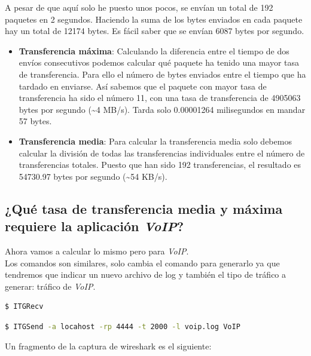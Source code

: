 \documentclass[11pt,a4paper]{article}
\begin{document}
A pesar de que aquí solo he puesto unos pocos, se envían un total de 192 paquetes en 2 segundos. Haciendo la suma de los bytes enviados en cada paquete hay un total de 12174 bytes. Es fácil saber que se envían 6087 bytes por segundo.

\begin{itemize}
	\item \textbf{Transferencia máxima}: Calculando la diferencia entre el tiempo de dos envíos consecutivos podemos calcular qué paquete ha tenido una mayor tasa de transferencia. Para ello el número de bytes enviados entre el tiempo que ha tardado en enviarse. Así sabemos que el paquete con mayor tasa de transferencia ha sido el número 11, con una tasa de transferencia de 4905063 bytes por segundo (\textasciitilde 4 MB/s). Tarda solo 0.00001264 milisegundos en mandar 57 bytes.
	\item \textbf{Transferencia media}: Para calcular la transferencia media solo debemos calcular la división de todas las transferencias individuales entre el número de transferencias totales. Puesto que han sido 192 transferencias, el resultado es 54730.97 bytes por segundo (\textasciitilde 54 KB/s).
\end{itemize}

\subsection{¿Qué tasa de transferencia media y máxima requiere la aplicación \textit{VoIP}?}

Ahora vamos a calcular lo mismo pero para \textit{VoIP}.\\

Los comandos son similares, solo cambia el comando para generarlo ya que tendremos que indicar un nuevo archivo de log y también el tipo de tráfico a generar: tráfico de \textit{VoIP}.

\begin{lstlisting}[language=bash,caption={Recibir el tráfico},captionpos=b]
$ ITGRecv
\end{lstlisting}

\begin{lstlisting}[language=bash,caption={General el tráfico},captionpos=b]
$ ITGSend -a locahost -rp 4444 -t 2000 -l voip.log VoIP
\end{lstlisting}

Un fragmento de la captura de wireshark es el siguiente:
\end{document}

